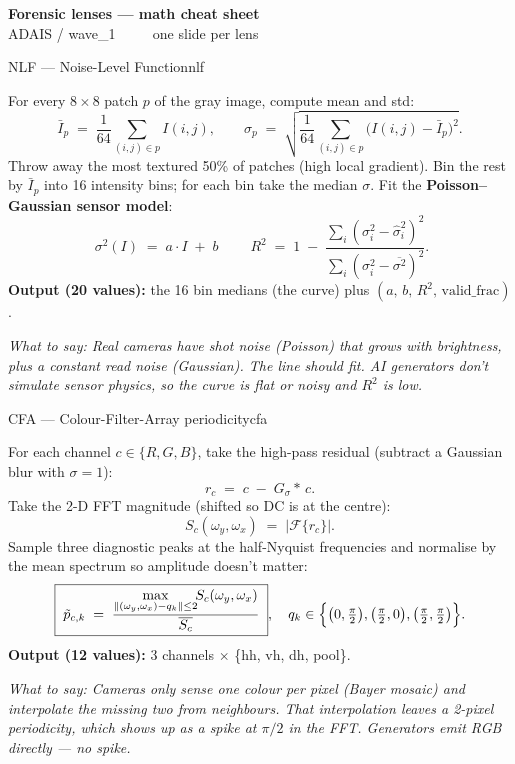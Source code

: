 \documentclass[12pt]{article}
\newcommand{\say}[1]{\par\smallskip\textit{\small \textcolor{black!60}{What to say:} #1}}
\begin{document}
\begin{center}
{\Huge\bfseries Forensic lenses --- math cheat sheet}\\[1mm]
{\small ADAIS / wave\_1 ~~~~ one slide per lens}
\end{center}
\bigskip

\begin{lensbox}{NLF --- Noise-Level Function}{nlf}

For every $8{\times}8$ patch $p$ of the gray image, compute mean and std:
\[
\bar I_p \;=\; \frac{1}{64}\sum_{(i,j)\in p} I(i,j),
\qquad
\sigma_p \;=\; \sqrt{\frac{1}{64}\sum_{(i,j)\in p}\bigl(I(i,j)-\bar I_p\bigr)^{\!2}}.
\]
Throw away the most textured 50\% of patches (high local gradient).
Bin the rest by $\bar I_p$ into 16 intensity bins; for each bin take the
median $\sigma$. Fit the \textbf{Poisson--Gaussian sensor model}:
\[
\boxed{\;\sigma^{2}(I)\;=\;a\cdot I \;+\; b\;}
\qquad
R^{2} \;=\; 1 \;-\; \frac{\sum_i (\sigma_i^{2}-\hat\sigma_i^{2})^{2}}
                          {\sum_i (\sigma_i^{2}-\overline{\sigma^{2}})^{2}}.
\]
\textbf{Output (20 values):} the 16 bin medians (the curve) plus
$(a,\,b,\,R^{2},\,\text{valid\_frac})$.

\say{Real cameras have \emph{shot noise} (Poisson) that grows with
brightness, plus a constant \emph{read noise} (Gaussian). The line should
fit. AI generators don't simulate sensor physics, so the curve is flat or
noisy and $R^{2}$ is low.}
\end{lensbox}

\bigskip
\begin{lensbox}{CFA --- Colour-Filter-Array periodicity}{cfa}

For each channel $c\in\{R,G,B\}$, take the high-pass residual
(subtract a Gaussian blur with $\sigma{=}1$):
\[
r_c \;=\; c \;-\; G_{\sigma}\!\ast\, c.
\]
Take the 2-D FFT magnitude (shifted so DC is at the centre):
\[
S_c(\omega_y,\omega_x) \;=\; \bigl|\mathcal{F}\{r_c\}\bigr|.
\]
Sample three diagnostic peaks at the half-Nyquist frequencies and
normalise by the mean spectrum so amplitude doesn't matter:
\[
\boxed{\;
\tilde p_{c,k} \;=\;
\frac{\max\limits_{\|(\omega_y,\omega_x)-q_k\|\le 2}\!\!S_c(\omega_y,\omega_x)}
     {\overline{S_c}}\;},
\quad
q_k \in \Bigl\{\bigl(0,\tfrac{\pi}{2}\bigr),\bigl(\tfrac{\pi}{2},0\bigr),
              \bigl(\tfrac{\pi}{2},\tfrac{\pi}{2}\bigr)\Bigr\}.
\]
\textbf{Output (12 values):} 3 channels $\times$ \{hh, vh, dh, pool\}.

\say{Cameras only sense one colour per pixel (Bayer mosaic) and
\emph{interpolate} the missing two from neighbours. That interpolation
leaves a 2-pixel periodicity, which shows up as a spike at $\pi/2$ in
the FFT. Generators emit RGB directly --- no spike.}
\end{lensbox}
\end{document}
